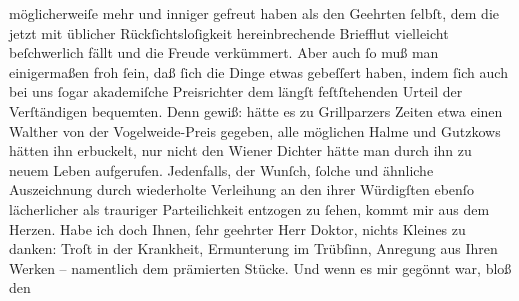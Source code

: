 \begin{ledgroupsized}[t]{13cm}
               möglicherweiſe mehr und inniger gefreut haben als den Geehrten ſelbſt, dem die jetzt
               mit üblicher Rückſichtsloſigkeit hereinbrechende Briefflut vielleicht beſchwerlich
               fällt {\pb}und die Freude verkümmert. Aber
               auch ſo muß man einigermaßen froh ſein, daß ſich die Dinge etwas gebeſſert haben,
               indem ſich auch bei uns ſogar akademiſche Preisrichter dem längſt feſtſtehenden
               Urteil der Verſtändigen bequemten. Denn gewiß: hätte es zu Grillparzers Zeiten etwa einen Walther von der Vogelweide-Preis gegeben, alle möglichen Halme und Gutzkows hätten
               ihn erbuckelt, nur nicht den Wiener Dichter hätte man durch ihn zu neuem Leben
               aufgerufen.\pend
           \pstart
           Jedenfalls, der Wunſch, ſolche und ähnliche Auszeichnung durch wiederholte {\pb}Verleihung an den ihrer Würdigſten ebenſo
               lächerlicher als trauriger Parteilichkeit entzogen zu ſehen, kommt mir aus dem
               Herzen. Habe ich doch Ihnen, ſehr geehrter Herr Doktor, nichts Kleines zu danken:
               Troſt in der Krankheit, Ermunterung im Trübſinn, Anregung aus Ihren Werken –
               namentlich dem prämierten Stücke.
               Und wenn es mir gegönnt war, bloß den \label{K_L01751_2v}
\end{ledgroupsized}
